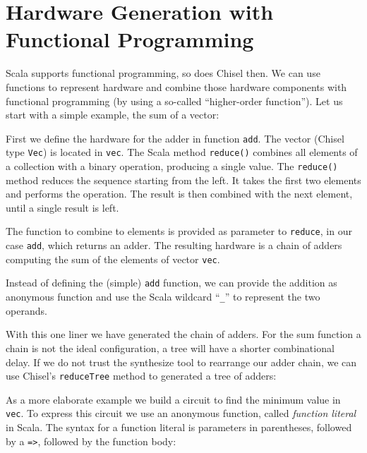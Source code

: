 \documentclass[%
    10pt,
    headinclude, footexclude,
    openright, %
    notitlepage,
    cleardoubleempty,
    headsepline,
    pointlessnumbers,
    bibtotoc, idxtotoc,
    ]{scrbook}
\newcommand{\code}[1]{{\small{\texttt{#1}}}}
\begin{document}

\section{Hardware Generation with Functional Programming}
\label{sec:functional}


Scala supports functional programming, so does Chisel then.
We can use functions to represent hardware and combine those hardware components
with functional programming (by using a so-called ``higher-order function'').
Let us start with a simple example, the sum of a vector:


\noindent First we define the hardware for the adder in function \code{add}.
The vector (Chisel type \code{Vec}) is located in \code{vec}. The Scala method \code{reduce()} combines
all elements of a collection with a binary operation, producing a single value.
The \code{reduce()} method reduces the sequence starting from the left.
It takes the first two elements and performs the operation. The result is then combined
with the next element, until a single result is left.

The function to combine to elements is provided as parameter to \code{reduce}, in our case \code{add},
which returns an adder. The resulting hardware is a chain of adders computing
the sum of the elements of vector \code{vec}.

Instead of defining the (simple) \code{add} function, we can provide the addition
as anonymous function and use the Scala wildcard ``\code{\_}'' to represent the
two operands.


\noindent With this one liner we have generated the chain of adders. For the sum function
a chain is not the ideal configuration, a tree will have a shorter combinational delay.
If we do not trust the synthesize tool to rearrange our adder chain, we can use Chisel's
\code{reduceTree} method to generated a tree of adders:


As a more elaborate example we build a circuit to find the minimum value in \code{vec}. To express this circuit
we use an anonymous function, called \emph{function literal} in Scala.  The syntax for a function
literal is parameters in parentheses, followed by a \code{=>}, followed by the function body:
\end{document}

